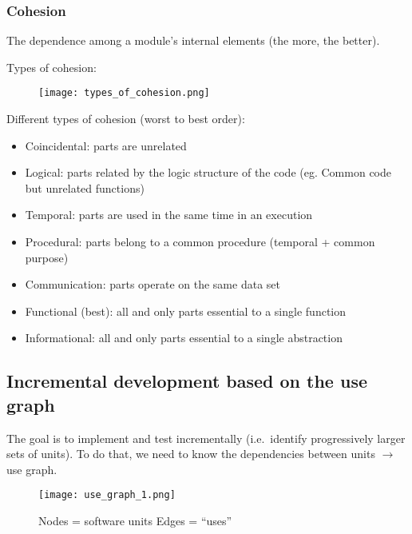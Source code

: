 \subsubsection{Cohesion}

The dependence among a module's internal elements (the more, the better). \newline

Types of cohesion:

\begin{figure}[!ht]
    \centering
    \texttt{[image: types\_of\_cohesion.png]}
\end{figure}

Different types of cohesion (worst to best order):

\begin{itemize}
\item Coincidental: parts are unrelated
\item Logical: parts related by the logic structure of the code (eg. Common code but
unrelated functions)
\item Temporal: parts are used in the same time in an execution
\item Procedural: parts belong to a common procedure (temporal + common purpose)
\item Communication: parts operate on the same data set
\item Functional (best): all and only parts essential to a single function
\item Informational: all and only parts essential to a single abstraction
\end{itemize}

\subsection{Incremental development based on the use graph}

The goal is to implement and test incrementally (i.e.\ identify progressively larger sets of
units). To do that, we need to know the dependencies between units $\rightarrow$ use graph. \newline

\begin{figure}[!ht]
    \begin{minipage}{\linewidth}
        \begin{minipage}{0.45\linewidth}
            \texttt{[image: use\_graph\_1.png]}
        \end{minipage}
        \begin{minipage}{0.45\linewidth}
            Nodes = software units \newline
            Edges = \enquote{uses}
        \end{minipage}
    \end{minipage}
\end{figure}

